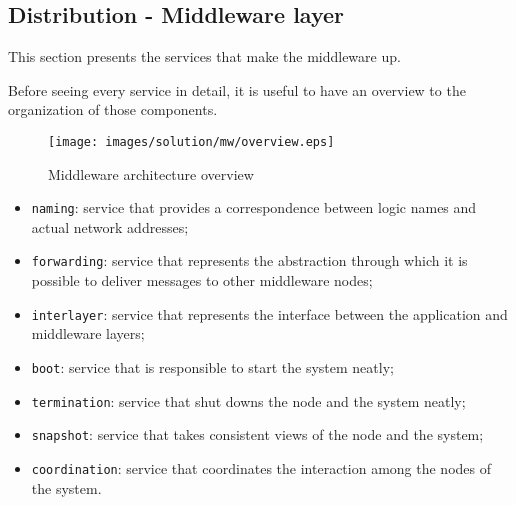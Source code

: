 \subsection{Distribution - Middleware layer}
This section presents the services that make the middleware up.

Before seeing every service in detail, it is useful to have an overview to the
organization of those components.

\begin{figure}[H]
  \centering
  \texttt{[image: images/solution/mw/overview.eps]}
  \caption{Middleware architecture overview}
  \label{fig:mw-arch-over}
\end{figure}

\begin{itemize}
  \item \texttt{naming}: service that provides a correspondence between logic
    names and actual network addresses;
  \item \texttt{forwarding}: service that represents the abstraction through
    which it is possible to deliver messages to other middleware nodes;
  \item \texttt{interlayer}: service that represents the interface between
    the application and middleware layers;
  \item \texttt{boot}: service that is responsible to start the system neatly;
  \item \texttt{termination}: service that shut downs the node and the system
    neatly;
  \item \texttt{snapshot}: service that takes consistent views of the node and
    the system;
  \item \texttt{coordination}: service that coordinates the interaction among
    the nodes of the system.
\end{itemize}








